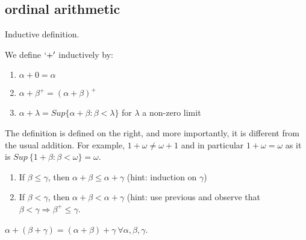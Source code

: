 \subsection{ordinal arithmetic}
Inductive definition.
\begin{definition}
We define $`+'$ inductively by:
\begin{enumerate}
\item $\alpha + 0 =\alpha$\\
\item $\alpha + \beta^+ =(\alpha + \beta)^+$\\
\item $\alpha + \lambda =Sup\{\alpha + \beta: \beta < \lambda\}$ for
$\lambda$ a non-zero limit
\end{enumerate}
\end{definition}
\begin{remark} The definition is defined on the right, and more importantly,
it is different from the usual addition. For example, $1+\omega \neq \omega+1$
 and in particular $1+\omega=\omega$ as it is $Sup~\{1+\beta: \beta < \omega\}=\omega$.
\end{remark}
\begin{exercise}
\begin{enumerate}
\item If $\beta \le \gamma$, then $\alpha + \beta \le \alpha + \gamma$
(hint: induction on $\gamma$)\\
\item If $\beta < \gamma$, then $\alpha + \beta < \alpha + \gamma$
(hint: use previous and observe that $\beta < \gamma \Rightarrow \beta^+ \le \gamma$.\\
\end{enumerate}
\end{exercise}
\begin{proposition} $\alpha + (\beta +\gamma)=(\alpha + \beta) + \gamma ~\forall \alpha,\beta,\gamma$.
\end{proposition}
